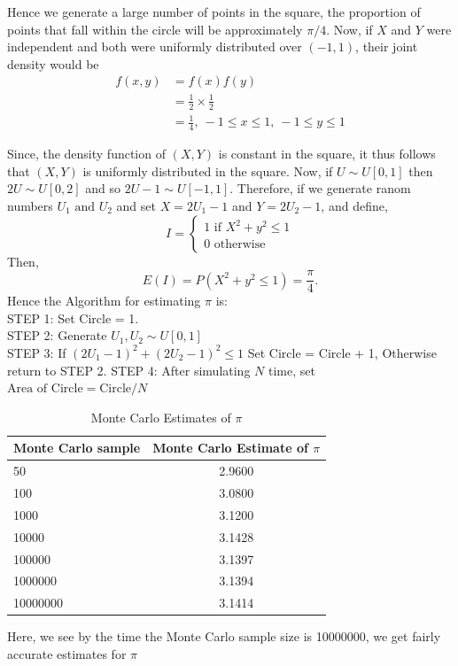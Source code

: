Hence we generate a large number of points in the square, the proportion of points that fall within the circle will be approximately $\pi/4$.
Now, if $X$ and $Y$ were independent and both were uniformly distributed over $(-1,1)$, their joint density would be
\begin{align*}
	f(x,y) & = f(x)f(y)                                         \\
	       & = \frac{1}{2} \times \frac{1}{2}                   \\
	       & = \frac{1}{4} , \  -1 \le x \le 1,\ -1 \le y \le 1
\end{align*}

Since, the density function of $(X,Y)$ is constant in the square, it thus follows that $(X,Y)$ is uniformly distributed in the square.
Now, if $U\sim U[0,1]$ then $2U\sim U[0,2]$ and so $2U-1\sim U[-1,1]$. Therefore, if we generate ranom numbers $U_1 \text{ and }  U_2$
and set $X=2U_1 - 1$ and $Y= 2U_2-1$, and define,
\[
	I = \begin{cases}
		1 \text{ if } X ^{2} + y ^{2} \le 1 \\
		0 \text{ otherwise }
	\end{cases}
\]
Then,
\[
	E(I)=P(X ^{2} + y ^{2} \le 1) = \frac{\pi}{4}.
\]
Hence the Algorithm for estimating $\pi$ is:\\
STEP 1: Set Circle = 1. \\
STEP 2: Generate $U_1, U_2\sim U[0,1]$\\
STEP 3: If $(2U_1-1)^{2}+ (2U_2-1)^{2} \le 1$ Set Circle = Circle + 1, Otherwise return to STEP 2.
STEP 4: After simulating $N$ time, set $\text{Area of Circle}  = \text{Circle}  / N$

\begin{table}[H]
	\centering
	\begin{tabular}{l c}
		\hline
		Monte Carlo sample & Monte Carlo Estimate of $\pi$ \\
		\hline
		50                 & 2.9600                        \\
		100                & 3.0800                        \\
		1000               & 3.1200                        \\
		10000              & 3.1428                        \\
		100000             & 3.1397                        \\
		1000000            & 3.1394                        \\
		10000000           & 3.1414                        \\
		\hline
	\end{tabular}
	\caption{Monte Carlo Estimates of $\pi$}
	\label{tab:montecarlopi}
\end{table}
Here, we see by the time the Monte Carlo sample size is 10000000, we get fairly accurate estimates for $\pi$



